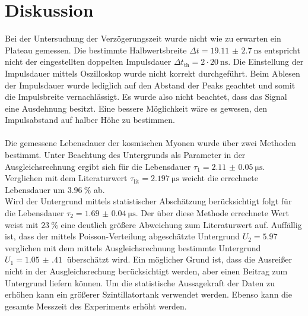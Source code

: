 \section{Diskussion}
\label{sec:Diskussion}
Bei der Untersuchung der Verzögerungszeit wurde nicht wie zu erwarten ein Plateau gemessen.
Die bestimmte Halbwertsbreite $\Delta t = \qty{19.11(270)}{\nano\second}$ entspricht nicht der eingestellten doppelten Impulsdauer $\Delta t_\text{th} = 2 \cdot \qty{20}{\nano\second}$.
Die Einstellung der Impulsdauer mittels Oszilloskop wurde nicht korrekt durchgeführt.
Beim Ablesen der Impulsdauer wurde lediglich auf den Abstand der Peaks geachtet und somit die Impulsbreite vernachlässigt.
Es wurde also nicht beachtet, dass das Signal eine Ausdehnung besitzt.
Eine bessere Möglichkeit wäre es gewesen, den Impulsabstand auf halber Höhe zu bestimmen.
\\
\\
Die gemessene Lebensdauer der kosmischen Myonen wurde über zwei Methoden bestimmt.
Unter Beachtung des Untergrunds als Parameter in der Ausgleichsrechnung ergibt sich für die Lebensdauer $\tau_1 = \qty{2.11(5)}{\micro\second}$.
Verglichen mit dem Literaturwert $\tau_\text{lit} = \qty{2.197}{\micro\second}$\cite{pdg} weicht die errechnete Lebensdauer um $\qty{3.96}{\percent}$ ab.
\\
Wird der Untergrund mittels statistischer Abschätzung berücksichtigt folgt für die Lebensdauer $\tau_2 = \qty{1.69(4)}{\micro\second}$.
Der über diese Methode errechnete Wert weist mit $\qty{23}{\percent}$ eine deutlich größere Abweichung zum Literaturwert auf.
Auffällig ist, dass der mittels Poisson-Verteilung abgeschätzte Untergrund $U_2 = \qty{5.97}{}$ verglichen mit dem mittels Ausgleichsrechnung bestimmte Untergrund $U_1 = \qty{1.05(41)}{}$ überschätzt wird.
Ein möglicher Grund ist, dass die Ausreißer nicht in der Ausgleichsrechung berücksichtigt werden, aber einen Beitrag zum Untergrund liefern können.
Um die statistische Aussagekraft der Daten zu erhöhen kann ein größerer Szintillatortank verwendet werden.
Ebenso kann die gesamte Messzeit des Experiments erhöht werden.